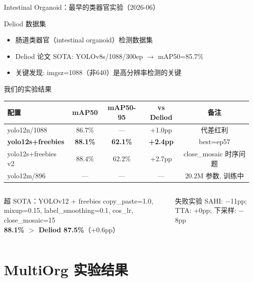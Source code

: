 \documentclass[aspectratio=169, 10pt]{beamer}
\begin{document}
\begin{frame}{Intestinal Organoid：最早的类器官实验（2026-06）}
  \begin{block}{Deliod 数据集}
    \begin{itemize}
      \item 肠道类器官（intestinal organoid）检测数据集
      \item Deliod 论文 SOTA: YOLOv8s/1088/300ep $\to$ mAP50=85.7\%
      \item 关键发现: imgsz=1088（非640）是高分辨率检测的关键
    \end{itemize}
  \end{block}
  \vspace{0em}
  \begin{block}{我们的实验结果}
    \begin{tabular}{lcccc}
      \toprule
      \textbf{配置} & \textbf{mAP50} & \textbf{mAP50-95} & \textbf{vs Deliod} & \textbf{备注} \\
      \midrule
      yolo12n/1088 & 86.7\% & — & +1.0pp & 代差红利 \\
      \textbf{yolo12s+freebies} & \textbf{88.1\%} & \textbf{62.1\%} & \textbf{+2.4pp} & best=ep57 \\
      yolo12s+freebies v2 & 88.4\% & 62.2\% & +2.7pp & close\_mosaic 时序问题 \\
      yolo12m/896 & — & — & — & 20.2M 参数, 训练中 \\
      \bottomrule
    \end{tabular}
  \end{block}
  \vspace{0em}
  \begin{columns}[T]
    \begin{alertblock}{超 SOTA：YOLOv12 + freebies}
      copy\_paste=1.0, mixup=0.15, label\_smoothing=0.1, cos\_lr, close\_mosaic=15 \\
      \textbf{88.1\% $>$ Deliod 87.5\%}（+0.6pp）
    \end{alertblock}
    \begin{block}{失败实验}
      SAHI: $-$11pp; TTA: +0pp; 下采样: $-$8pp
    \end{block}
  \end{columns}
\end{frame}

\section{MultiOrg 实验结果}
\end{document}
